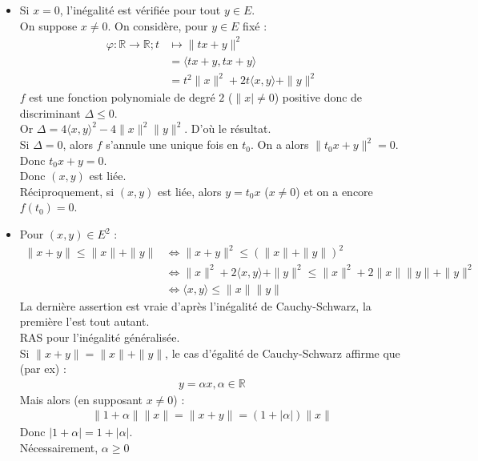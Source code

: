 \documentclass[../main.tex]{subfiles}
\begin{document}
\begin{itemize}
    \item Si $x = 0$, l'inégalité est vérifiée pour tout $y\in E$. \\
    On suppose $x\neq 0$. On considère, pour $y\in E$ fixé : 
    \begin{align*}
        \varphi:\mathbb{R}\to \mathbb{R}; t&\mapsto \|tx + y\|^2 \\
        &= \langle tx+y, tx+y\rangle \\
        &= t^2 \|x\|^2 + 2t\langle x, y\rangle + \|y\|^2
    \end{align*}
    $f$ est une fonction polynomiale de degré $2$ ($\|x|\neq 0$) positive donc de discriminant $\Delta \leq 0$. \\
    Or $\Delta = 4\langle x, y\rangle^2 - 4\|x\|^2\|y\|^2$. D'où le résultat. \\
    Si $\Delta = 0$, alors $f$ s'annule une unique fois en $t_0$. On a alors $\|t_0 x + y\|^2 = 0$. \\
    Donc $t_0 x + y = 0$. \\
    Donc $(x, y)$ est liée. \\
    Réciproquement, si $(x, y)$ est liée, alors $y = t_0 x$ ($x\neq 0$) et on a encore $f(t_0) = 0$. 

    \item Pour $(x, y)\in E^2$ : 
    \begin{align*}
        \|x+y\| \leq \|x\| + \|y\| &\Leftrightarrow \|x+y\|^2\leq (\|x\| + \|y\|)^2 \\
        &\Leftrightarrow \|x\|^2 + 2\langle x, y\rangle + \|y\|^2 \leq \|x\|^2 + 2\|x\|\|y\| + \|y\|^2 \\
        &\Leftrightarrow \langle x, y\rangle \leq \|x\|\|y\|
    \end{align*}
    La dernière assertion est vraie d'après l'inégalité de Cauchy-Schwarz, la première l'est tout autant. \\
    RAS pour l'inégalité généralisée. \\
    Si $\|x+y\| = \|x\| + \|y\|$, le cas d'égalité de Cauchy-Schwarz affirme que (par ex) : 
    \begin{align*}
        y = \alpha x, \alpha\in \mathbb{R}
    \end{align*}
    Mais alors (en supposant $x \neq 0$) : 
    \begin{align*}
        \| 1 + \alpha\| \|x\| = \|x + y\| = (1 + |\alpha|) \|x\|
    \end{align*}
    Donc $|1 + \alpha| = 1 + |\alpha|$. \\
    Nécessairement, $\alpha\geq 0$
\end{itemize}
\end{document}
